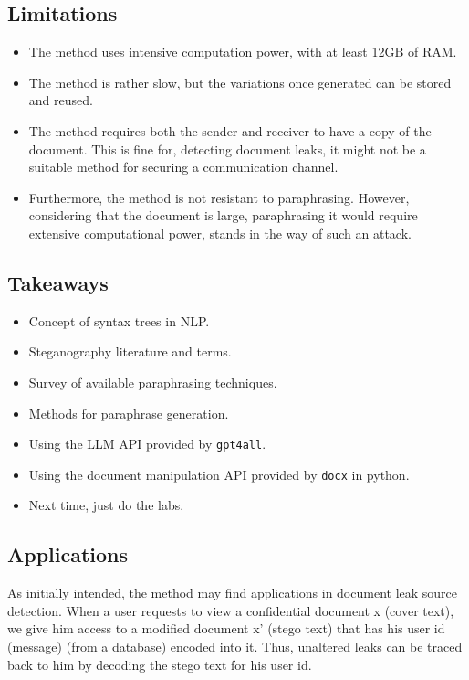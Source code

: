 \documentclass{article}
\begin{document}
\subsection{Limitations}
\begin{itemize}
\item The method uses intensive computation power, with at least 12GB of RAM.
\item The method is rather slow, but the variations once generated can be stored and reused.
\item The method requires both the sender and receiver to have a copy of the document. This is fine for, detecting document leaks, it might not be a suitable method for securing a communication channel.
\item Furthermore, the method is not resistant to paraphrasing. However, considering that the document is large, paraphrasing it would require extensive computational power, stands in the way of such an attack.
\end{itemize}
\subsection{Takeaways}
\begin{itemize}
\item Concept of syntax trees in NLP.
\item Steganography literature and terms.
\item Survey of available paraphrasing techniques.
\item Methods for paraphrase generation.
\item Using the LLM API provided by \texttt{gpt4all}.
\item Using the document manipulation API provided  by \texttt{docx} in python.
\item Next time, just do the labs.
\end{itemize}
\subsection{Applications}
As initially intended, the method may find applications in document leak source detection. When a user requests to view a confidential document x (cover text), we give him access to a modified document x' (stego text) that has his user id (message) (from a database) encoded into it. Thus, unaltered leaks can be traced back to him by decoding the stego text for his user id.
\end{document}
